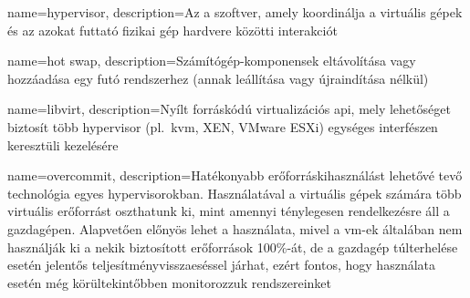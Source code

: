 
{
	name=hypervisor,
	description={Az a szoftver, amely koordinálja a virtuális gépek és az azokat futtató fizikai gép hardvere közötti interakciót}
}

{
	name={hot swap},
	description={Számítógép-komponensek eltávolítása vagy hozzáadása egy futó rendszerhez (annak leállítása vagy újraindítása nélkül)}
}

{
	name=libvirt,
	description={Nyílt forráskódú virtualizációs \acrshort{api}, mely lehetőséget biztosít több \gls{hypervisor} (pl.~\acrshort{kvm}, XEN, VMware ESXi) egységes interfészen keresztüli kezelésére}
}

{
	name=overcommit,
	description={Hatékonyabb erőforráskihasználást lehetővé tevő technológia egyes \gls{hypervisor}okban. Használatával a virtuális gépek számára több virtuális erőforrást oszthatunk ki, mint amennyi ténylegesen rendelkezésre áll a gazdagépen. Alapvetően előnyös lehet a használata, mivel a \acrshort{vm}-ek általában nem használják ki a nekik biztosított erőforrások 100\%-át, de a gazdagép túlterhelése esetén jelentős teljesítményvisszaeséssel járhat, ezért fontos, hogy használata esetén még körültekintőbben monitorozzuk rendszereinket~\cite{RedHatKvmOvercommit}}
}